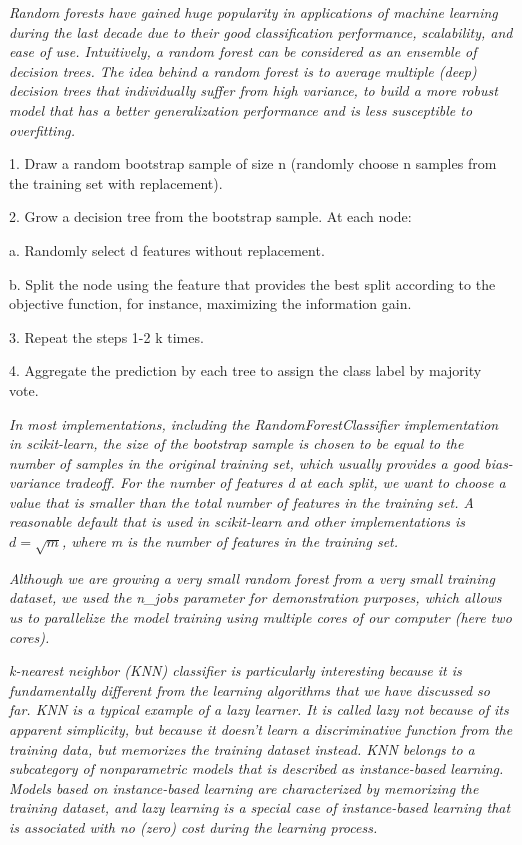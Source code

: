 \textit{Random forests have gained huge popularity in applications of machine learning during the last decade due to their good classification performance, scalability, and ease of use. Intuitively, a random forest can be considered as an ensemble of decision trees. The idea behind a random forest is to average multiple (deep) decision trees that individually suffer from high variance, to build a more robust model that has a better generalization performance and is less susceptible to overfitting.}

1. Draw a random bootstrap sample of size n (randomly choose n samples from the training set with replacement).

2. Grow a decision tree from the bootstrap sample. At each node:

a. Randomly select d features without replacement.

b. Split the node using the feature that provides the best split according to the objective function, for instance, maximizing the information gain.

3. Repeat the steps 1-2 k times.

4. Aggregate the prediction by each tree to assign the class label by majority vote.

\textit{In most implementations, including the RandomForestClassifier implementation in scikit-learn, the size of the bootstrap sample is chosen to be equal to the number of samples in the original training set, which usually provides a good bias-variance tradeoff. For the number of features d at each split, we want to choose a value that is smaller than the total number of features in the training set. A reasonable default that is used in scikit-learn and other implementations is $d=\sqrt{m}$, where m is the number of features in the training set.}

\textit{Although we are growing a very small random forest from a very small training dataset, we used the n\_jobs parameter for demonstration purposes, which allows us to parallelize the model training using multiple cores of our computer (here two cores).}

\textit{k-nearest neighbor (KNN) classifier is particularly interesting because it is fundamentally different from the learning algorithms that we have discussed so far.  KNN is a typical example of a lazy learner. It is called lazy not because of its apparent simplicity, but because it doesn't learn a discriminative function from the training data, but memorizes the training dataset instead. KNN belongs to a subcategory of nonparametric models that is described as instance-based learning. Models based on instance-based learning are characterized by memorizing the training dataset, and lazy learning is a special case of instance-based learning that is associated with no (zero) cost during the learning process.}

